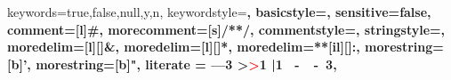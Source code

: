 \expandafter\expandafter\expandafter\lstdefinelanguage
\expandafter{\language@yaml}
{
	keywords={true,false,null,y,n},
	keywordstyle=\color{darkgray}\bfseries,
	basicstyle=\YAMLkeystyle,                                 %
	sensitive=false,
	comment=[l]{\#},
	morecomment=[s]{/*}{*/},
	commentstyle=\color{purple}\ttfamily,
	stringstyle=\YAMLvaluestyle\ttfamily,
	moredelim=[l][\color{orange}]{\&},
	moredelim=[l][\color{magenta}]{*},
	moredelim=**[il][\YAMLcolonstyle{:}\YAMLvaluestyle]{:},   %
	morestring=[b]',
	morestring=[b]",
	literate =    {---}{{\ProcessThreeDashes}}3
	{>}{{\textcolor{red}\textgreater}}1     
	{|}{{\textcolor{red}\textbar}}1 
	{\ -\ }{{\mdseries\ -\ }}3,
}

\makeatother

\newcommand\ProcessThreeDashes{\llap{\color{cyan}\mdseries-{-}-}}

\usepackage{lipsum}    %
\usepackage{graphicx} %
\usepackage[german]{varioref} 	%
\usepackage{caption}	%
\usepackage{lscape}
\usepackage{booktabs} %
\newcommand{\ra}[1]{\renewcommand{\arraystretch}{#1}}
\usepackage{longtable} %
\usepackage{multirow}
\usepackage{array}


\usepackage{algorithm} %
\usepackage{algpseudocode}
\renewcommand{\listalgorithmname}{Algorithmenverzeichnis }


\usepackage{lmodern} %

\pagestyle{scrheadings}
\renewcommand*{\pnumfont}{\upshape\sffamily}
\renewcommand*{\headfont}{\upshape\sffamily}
\renewcommand*{\footfont}{\upshape\sffamily}
\renewcommand{\chaptermarkformat}{}
\clearscrheadfoot


\ofoot[\rule{0pt}{\ht\strutbox+\dp\strutbox}\pagemark]{\rule{0pt}{\ht\strutbox+\dp\strutbox}\pagemark}

\ohead{\headmark}
